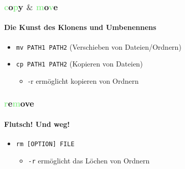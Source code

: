 \documentclass[12pt,utf8]{beamer}
\begin{document}

\begin{frame}
\frametitle{\textcolor{lightGreen}{c}o\textcolor{lightGreen}{p}y $\&$ \textcolor{lightGreen}{m}o\textcolor{lightGreen}{v}e}
\framesubtitle{Die Kunst des Klonens und Umbenennens}
\begin{itemize}
	\item \texttt{mv PATH1 PATH2} (Verschieben von Dateien/Ordnern)
	\item \texttt{cp PATH1 PATH2} (Kopieren von Dateien)
	\begin{itemize}
		\item -r ermöglicht kopieren von Ordnern
	\end{itemize}
\end{itemize}
\end{frame}

\begin{frame}
\frametitle{\textcolor{lightGreen}{r}e\textcolor{lightGreen}{m}ove}
\framesubtitle{Flutsch! Und weg!}
\begin{itemize}
	\item \texttt{rm [OPTION] FILE}
	\begin{itemize}[<+->]
		\item \texttt{-r} ermöglicht das Löchen von Ordnern
	\end{itemize}
\end{itemize}
\end{frame}
\end{document}

